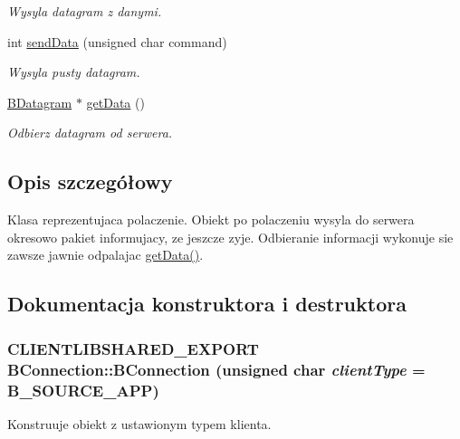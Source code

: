 \begin{DoxyCompactItemize}
\begin{DoxyCompactList}\small\item\em Wysyla datagram z danymi. \item\end{DoxyCompactList}\item 
int \hyperlink{class_b_connection_ae6e720ac6a03bd3672ab440eb1e9b8c5}{sendData} (unsigned char command)
\begin{DoxyCompactList}\small\item\em Wysyla pusty datagram. \item\end{DoxyCompactList}\item 
\hyperlink{class_b_datagram}{BDatagram} $\ast$ \hyperlink{class_b_connection_a68fb4ff5ee98e5228378d08a2fe2ae19}{getData} ()
\begin{DoxyCompactList}\small\item\em Odbierz datagram od serwera. \item\end{DoxyCompactList}\end{DoxyCompactItemize}


\subsection{Opis szczegółowy}
Klasa reprezentujaca polaczenie. Obiekt po polaczeniu wysyla do serwera okresowo pakiet informujacy, ze jeszcze zyje. Odbieranie informacji wykonuje sie zawsze jawnie odpalajac \hyperlink{class_b_connection_a68fb4ff5ee98e5228378d08a2fe2ae19}{getData()}. 

\subsection{Dokumentacja konstruktora i destruktora}
\hypertarget{class_b_connection_a9b85170ee6ea831111b50a55d45ef8eb}{
\subsubsection[{BConnection}]{\setlength{\rightskip}{0pt plus 5cm}CLIENTLIBSHARED\_\-EXPORT BConnection::BConnection (unsigned char {\em clientType} = {\ttfamily B\_\-SOURCE\_\-APP})}}
\label{class_b_connection_a9b85170ee6ea831111b50a55d45ef8eb}


Konstruuje obiekt z ustawionym typem klienta. 


